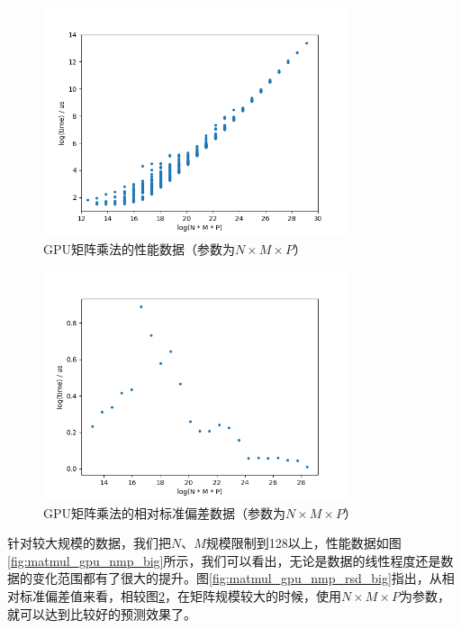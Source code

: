     \begin{figure}[!htbp]
        \centering
        \includegraphics[width=0.8\textwidth]{figures/matmul_gpu_nmp.png}
        \caption{GPU矩阵乘法的性能数据（参数为$N \times M \times P $）}
        \label{fig:matmul_gpu_nmp}
    \end{figure}

    \begin{figure}[!htbp]
        \centering
        \includegraphics[width=0.8\textwidth]{figures/matmul_gpu_nmp_rsd.png}
        \caption{GPU矩阵乘法的相对标准偏差数据（参数为$ N \times M \times P $）}
        \label{fig:matmul_gpu_nmp_rsd}
    \end{figure}
    
    针对较大规模的数据，我们把$ N $、$ M $规模限制到128以上，性能数据如图\ref{fig:matmul_gpu_nmp_big}所示，我们可以看出，无论是数据的线性程度还是数据的变化范围都有了很大的提升。图\ref{fig:matmul_gpu_nmp_rsd_big}指出，从相对标准偏差值来看，相较图\ref{fig:matmul_gpu_nmp_rsd}，在矩阵规模较大的时候，使用$ N \times M \times P $为参数，就可以达到比较好的预测效果了。
    
